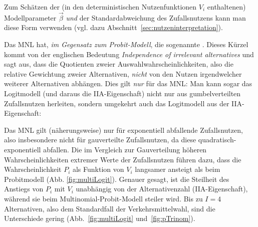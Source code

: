 Zum Sch\"atzen der (in den deterministischen Nutzenfunktionen $V_i$
enthaltenen) Modellparameter $\vec{\beta}$ \emph{und} der
Standardabweichung des Zufallsnutzens kann man diese Form
verwenden (vgl. dazu 
Abschnitt~\ref{sec:nutzeninterpretation}).

\item Das MNL hat, \emph{im Gegensatz zum Probit-Modell},  die
sogenannte . Dieses K\"urzel kommt von der
englischen Bedeutung \textit{Independence of irrelevant alternatives}
und sagt aus, dass die Quotienten zweier Auswahlwahrscheinlichkeiten,
also die relative Gewichtung zweier Alternativen, \textit{nicht} von
den Nutzen irgendwelcher weiterer Alternativen abh\"angen. Dies gilt
\emph{nur} f\"ur das MNL:  Man kann sogar das Logitmodell
(und daraus die  IIA-Eigenschaft) 
nicht nur aus gumbelverteilten Zufallsnutzen herleiten, sondern
umgekehrt auch das
Logitmodell aus der
IIA-Eigenschaft:

\be
\label{IIAisMNL}
 \Longleftrightarrow {}
\ee


\item Das MNL gilt (n\"aherungsweise) nur f\"ur exponentiell abfallende
Zufallsnutzen, also insbesondere nicht f\"ur gau\3verteilte
Zufallsnutzen, da diese quadratisch-exponentiell abfallen. 
Die im Vergleich zur Gau\3verteilung h\"oheren
Wahrscheinlichkeiten extremer Werte der Zufallsnutzen f\"uhren dazu, dass die
Wahrscheinlichkeit $P_i$ als Funktion von $V_i$ langsamer ansteigt als
beim Probitmodell (Abb. \ref{fig:multiLogit}). Genauer gesagt, ist
die Steilheit des Anstiegs von $P_i$ mit $V_i$ unabh\"angig von der
Alternativenzahl (IIA-Eigenschaft), w\"ahrend sie beim
Multi\-no\-mi\-al-Probit-Modell steiler wird. Bis zu $I=4$
Alternativen, also dem Standardfall der Verkehrsmittelwahl, sind
die Unterschiede gering (Abb.~\ref{fig:multiLogit} und~\ref{fig:pTrinom}).
\ei

